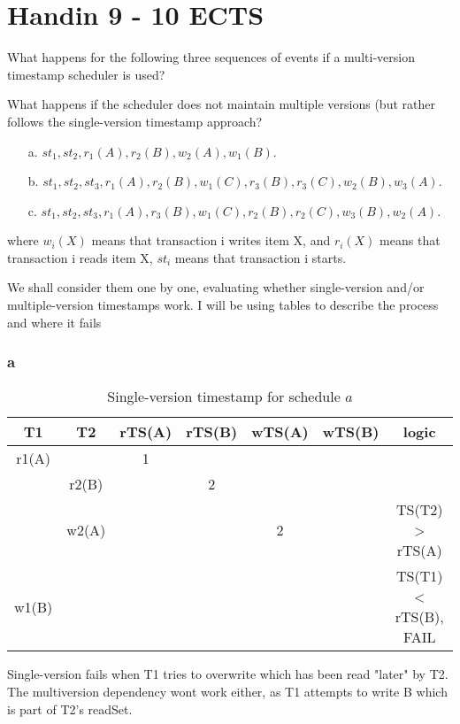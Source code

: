 \documentclass[working, oneside]{../../Preambles/tuftebook}
\begin{document}
\let\cleardoublepage\clearpage
\thispagestyle{fancy}
\chapter{Handin 9 - 10 ECTS}
\begin{exercise}[1]
What happens for the following three sequences of events if a multi-version timestamp scheduler is used?

What happens if the scheduler does not maintain multiple versions (but rather follows the single-version timestamp approach?
\begin{enumerate}
    \item[a.] \(st_1, st_2, r_1(A), r_2(B), w_2(A), w_1(B)\).
    \item[b.] \(st_1, st_2, st_3, r_1(A), r_2(B), w_1(C), r_3(B), r_3(C), w_2(B), w_3(A)\).
    \item[c.] \(st_1, st_2, st_3, r_1(A), r_3(B), w_1(C), r_2(B), r_2(C), w_3(B), w_2(A)\).
\end{enumerate}
where \(w_i(X)\) means that transaction i writes item X, and \(r_i(X)\) means that transaction i reads item X, \(st_i\) means that transaction i starts.
\end{exercise}
We shall consider them one by one, evaluating whether single-version and/or multiple-version timestamps work. I will be using tables to describe the process and where it fails
\subsection*{a}
 \begin{table}[htpb]
    \centering
    \caption{Single-version timestamp for schedule $a$}
    \label{tab:label}
    \begin{tabular}{c|c|c|c|c|c|c}
        T1 & T2 & rTS(A) & rTS(B) & wTS(A) & wTS(B) & logic \\ \hline
        r1(A) &  & 1 &  &  &  & \\
         & r2(B) &  & 2 &  &  & \\
         & w2(A) &  &  & 2 &  & TS(T2) > rTS(A) \\
        w1(B) &  &  &  &  &  & TS(T1) < rTS(B), FAIL \\ 
    \end{tabular}
\end{table}
\noindent
Single-version fails when T1 tries to overwrite which has been read "later" by T2. The multiversion dependency wont work either, as T1 attempts to write B which is part of T2's readSet.
\end{document}
